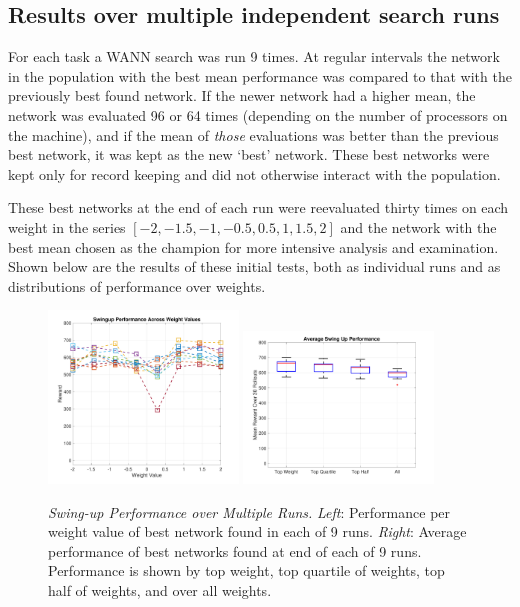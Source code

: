 \subsection{Results over multiple independent search runs}
For each task a WANN search was run 9 times. At regular intervals the network in the population with the best mean performance was compared to that with the previously best found network. If the newer network had a higher mean, the network was evaluated 96 or 64 times (depending on the number of processors on the machine), and if the mean of \textit{those} evaluations was better than the previous best network, it was kept as the new `best' network. These best networks were kept only for record keeping and did not otherwise interact with the population. 

These best networks at the end of each run were reevaluated thirty times on each weight in the series $[-2,-1.5,-1,-0.5,0.5,1,1.5,2]$ and the network with the best mean chosen as the champion for more intensive analysis and examination. Shown below are the results of these initial tests, both as individual runs and as distributions of performance over weights.

\begin{figure}[ht!]
\vskip -0.05in %
    \centering        
    \includegraphics[width=0.45\textwidth]{supplemental/swingup_data/fitByWeight.pdf}
    \includegraphics[width=0.45\textwidth]{supplemental/swingup_data/fitByWeightBox.pdf}   
\vskip -0.05in %
    \caption      
    {     
	\textit{Swing-up Performance over Multiple Runs.}
	\newline
	\textit{Left}: Performance per weight value of best network found in each of 9 runs.
	\newline
	\textit{Right}: Average performance of best networks found at end of each of 9 runs. Performance is shown by top weight, top quartile of weights, top half of weights, and over all weights.
    }         
    \label{fig:swingup}
\vskip -0.15in %
\end{figure}

